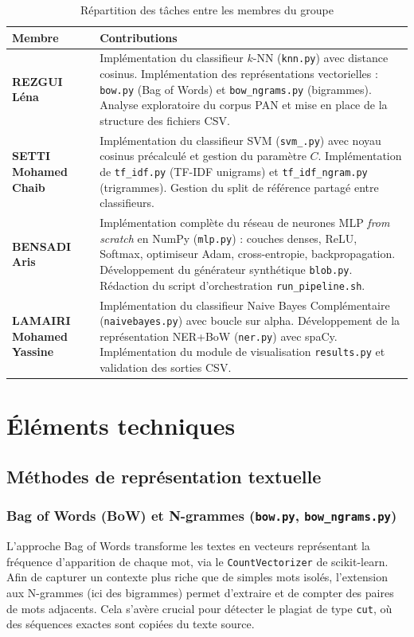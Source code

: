 \documentclass[12pt,a4paper]{article}
\begin{document}
\begin{table}[H]
\centering
\caption{Répartition des tâches entre les membres du groupe}
\label{tab:repartition}
\begin{tabularx}{\textwidth}{lX}
\toprule
\textbf{Membre} & \textbf{Contributions} \\
\midrule
\textbf{REZGUI Léna}
& Implémentation du classifieur $k$-NN (\texttt{knn.py}) avec distance cosinus. Implémentation des représentations vectorielles : \texttt{bow.py} (Bag of Words) et \texttt{bow\_ngrams.py} (bigrammes). Analyse exploratoire du corpus PAN et mise en place de la structure des fichiers CSV. \\
\addlinespace
\textbf{SETTI Mohamed Chaib}
& Implémentation du classifieur SVM (\texttt{svm\_.py}) avec noyau cosinus précalculé et gestion du paramètre $C$. Implémentation de \texttt{tf\_idf.py} (TF-IDF unigrams) et \texttt{tf\_idf\_ngram.py} (trigrammes). Gestion du split de référence partagé entre classifieurs. \\
\addlinespace
\textbf{BENSADI Aris}
& Implémentation complète du réseau de neurones MLP \textit{from scratch} en NumPy (\texttt{mlp.py}) : couches denses, ReLU, Softmax, optimiseur Adam, cross-entropie, backpropagation. Développement du générateur synthétique \texttt{blob.py}. Rédaction du script d'orchestration \texttt{run\_pipeline.sh}. \\
\addlinespace
\textbf{LAMAIRI Mohamed Yassine}
& Implémentation du classifieur Naive Bayes Complémentaire (\texttt{naivebayes.py}) avec boucle sur alpha. Développement de la représentation NER+BoW (\texttt{ner.py}) avec spaCy. Implémentation du module de visualisation \texttt{results.py} et validation des sorties CSV. \\
\bottomrule
\end{tabularx}
\end{table}

\section{Éléments techniques}

\subsection{Méthodes de représentation textuelle}

\subsubsection{Bag of Words (BoW) et N-grammes (\texttt{bow.py}, \texttt{bow\_ngrams.py})}
L'approche Bag of Words transforme les textes en vecteurs représentant la fréquence d'apparition de chaque mot, via le \texttt{CountVectorizer} de scikit-learn. Afin de capturer un contexte plus riche que de simples mots isolés, l'extension aux N-grammes (ici des bigrammes) permet d'extraire et de compter des paires de mots adjacents. Cela s'avère crucial pour détecter le plagiat de type \texttt{cut}, où des séquences exactes sont copiées du texte source.
\end{document}
